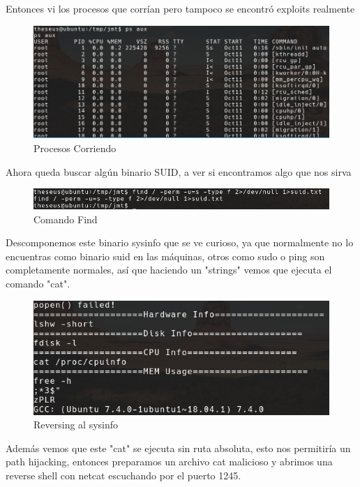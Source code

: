 \documentclass{article}
\begin{document}
Entonces vi los procesos que corrían pero tampoco se encontró exploits realmente

\begin{figure}[h!]
	\center 
	\includegraphics[width=\textwidth]{images/magic/vista-procesos.png}
	\caption{Procesos Corriendo}
\end{figure}

Ahora queda buscar algún binario SUID, a ver si encontramos algo que nos sirva 

\begin{figure}[h!]
	\center 
	\includegraphics[width=\textwidth]{images/magic/busqueda-find.png}
	\caption{Comando Find}
\end{figure}

\clearpage

Descomponemos este binario sysinfo que se ve curioso, ya que normalmente no lo encuentras como binario suid en las máquinas, otros como sudo o ping son completamente normales, así que haciendo un "strings" vemos que ejecuta el comando "cat".

\begin{figure}[h!]
	\center 
	\includegraphics[width=\textwidth]{images/magic/strings-sysinfo.png}
	\caption{Reversing al sysinfo}
\end{figure}

Además vemos que este "cat" se ejecuta sin ruta absoluta, esto nos permitiría un path hijacking, entonces preparamos un archivo cat malicioso y abrimos una reverse shell con netcat escuchando por el puerto 1245.
\end{document}
